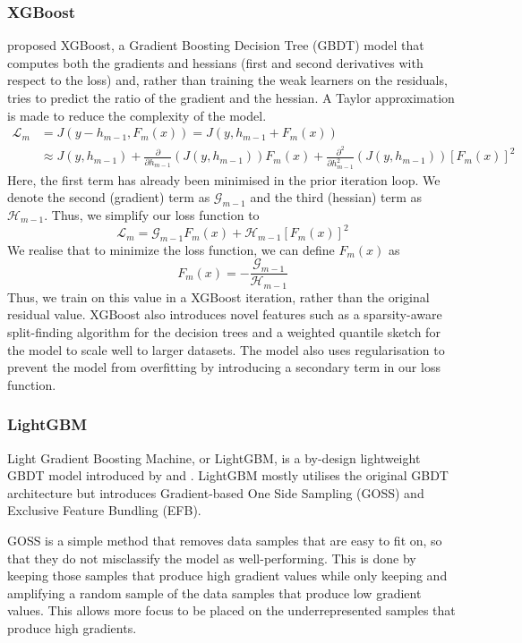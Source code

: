 \documentclass[pdflatex,sn-basic,10pt]{sn-jnl}%
\begin{document}
\subsubsection{XGBoost}
\cite{xgboost} proposed XGBoost, a Gradient Boosting Decision Tree (GBDT) model that computes both the gradients and hessians (first and second derivatives with respect to the loss) and, rather than training the weak learners on the residuals, tries to predict the ratio of the gradient and the hessian. A Taylor approximation is made to reduce the complexity of the model.
\begin{align*}
    \mathcal{L}_m &= J(y-h_{m-1}, F_m(x)) = J(y, h_{m-1}+F_m(x)) \\
    &\approx J(y, h_{m-1}) +  \frac{\partial}{\partial h_{m-1}}  \left(J(y, h_{m-1})\right) F_m (x) + \frac{\partial^2}{\partial h_{m-1}^2}  \left(J(y, h_{m-1})\right) \left[F_m (x)\right]^2
\end{align*}
Here, the first term has already been minimised in the prior iteration loop. We denote the second (gradient) term as $\mathcal{G}_{m-1}$ and the third (hessian) term as $\mathcal{H}_{m-1}$. Thus, we simplify our loss function to
$$\mathcal{L}_m = \mathcal{G}_{m-1} F_m(x) + \mathcal{H}_{m-1} \left[F_m (x)\right]^2$$
We realise that to minimize the loss function, we can define $F_m(x)$ as
$$F_m(x) = -\frac{\mathcal{G}_{m-1}}{\mathcal{H}_{m-1}}$$
Thus, we train on this value in a XGBoost iteration, rather than the original residual value. XGBoost also introduces novel features such as a sparsity-aware split-finding algorithm for the decision trees and a weighted quantile sketch for the model to scale well to larger datasets. The model also uses regularisation to prevent the model from overfitting by introducing a secondary term in our loss function.

\subsubsection{LightGBM}

Light Gradient Boosting Machine, or LightGBM, is a by-design lightweight GBDT model introduced by \cite{meng2016communication} and \cite{ke2017lightgbm}. LightGBM mostly utilises the original GBDT architecture but introduces Gradient-based One Side Sampling (GOSS) and Exclusive Feature Bundling (EFB). 

GOSS is a simple method that removes data samples that are easy to fit on, so that they do not misclassify the model as well-performing. This is done by keeping those samples that produce high gradient values while only keeping and amplifying a random sample of the data samples that produce low gradient values. This allows more focus to be placed on the underrepresented samples that produce high gradients. 
\end{document}
